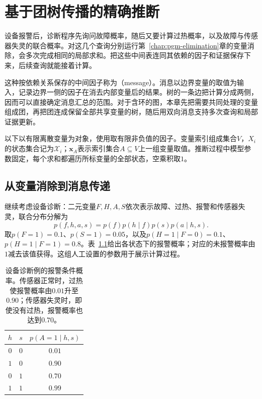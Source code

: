 \chapter{基于团树传播的精确推断}
\label{chap:pgm-junction-tree}

设备报警后，诊断程序先询问故障概率，随后又要计算过热概率，以及故障与传感器失灵的联合概率。对这几个查询分别运行第~\ref{chap:pgm-elimination}章的变量消除，会多次完成相同的局部求和。把这些中间表连同其依赖的因子和证据保存下来，后续查询就能接着计算。

这种按依赖关系保存的中间因子称为（message）。消息以边界变量的取值为输入，记录边界一侧的因子在消去内部变量后的结果。树的一条边把计算分成两侧，因而可以直接确定消息汇总的范围。对于含环的图，本章先把需要共同处理的变量组成团，再把团连成保留全部共享变量的树，随后用双向消息支持多次查询和局部证据更新。

以下以有限离散变量为对象，使用取有限非负值的因子。变量索引组成集合$V$，$X_i$的状态集合记为$\mathcal{X}_i$；$\bm{x}_A$表示索引集合$A\subseteq V$上一组变量取值。推断过程中模型参数固定，每个求和都遍历所标变量的全部状态，空乘积取$1$。

\section{从变量消除到消息传递}
\label{sec:pgm-junction-tree-from-elimination}

继续考虑设备诊断：二元变量$F,H,A,S$依次表示故障、过热、报警和传感器失灵，联合分布分解为
\begin{equation}
  p(f,h,a,s)=p(f)p(h\mid f)p(s)p(a\mid h,s).
  \label{eq:pgm-junction-tree-device}
\end{equation}
取$p(F=1)=0.1$、$p(S=1)=0.05$，以及$p(H=1\mid F=0)=0.1$、$p(H=1\mid F=1)=0.8$。表~\ref{tab:pgm-junction-tree-alarm-cpt}给出各状态下的报警概率；对应的未报警概率由$1$减去该值获得。这组人工设置的参数用于展示计算过程。

\begin{table}[htbp]
  \centering
  \begin{tabular}{ccc}
    \toprule
    $h$ & $s$ & $p(A=1\mid h,s)$\\
    \midrule
    $0$ & $0$ & $0.01$\\
    $1$ & $0$ & $0.90$\\
    $0$ & $1$ & $0.70$\\
    $1$ & $1$ & $0.99$\\
    \bottomrule
  \end{tabular}
  \caption{设备诊断例的报警条件概率。传感器正常时，过热使报警概率由$0.01$升至$0.90$；传感器失灵时，即使没有过热，报警概率也达到$0.70$。}
  \label{tab:pgm-junction-tree-alarm-cpt}
\end{table}

